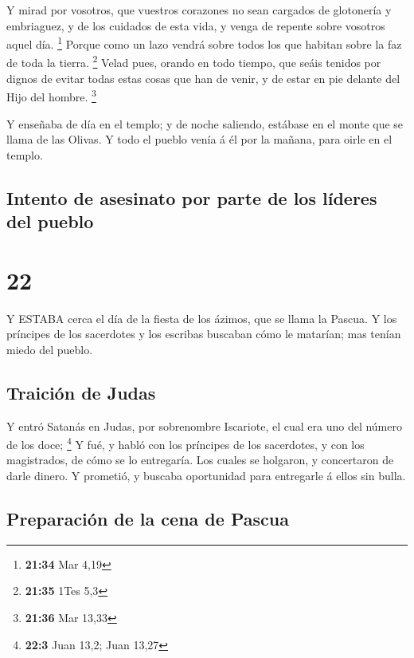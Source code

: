  Y mirad por vosotros, que vuestros corazones no sean
cargados de glotonería y embriaguez, y de los cuidados de esta vida, y
venga de repente sobre vosotros aquel día. \footnote{\textbf{21:34} Mar
  4,19}  Porque como un lazo vendrá sobre todos los que
habitan sobre la faz de toda la tierra. \footnote{\textbf{21:35} 1Tes
  5,3}  Velad pues, orando en todo tiempo, que seáis
tenidos por dignos de evitar todas estas cosas que han de venir, y de
estar en pie delante del Hijo del hombre. \footnote{\textbf{21:36} Mar
  13,33}

 Y enseñaba de día en el templo; y de noche saliendo,
estábase en el monte que se llama de las Olivas.  Y todo el
pueblo venía á él por la mañana, para oirle en el templo.

\hypertarget{intento-de-asesinato-por-parte-de-los-luxedderes-del-pueblo}{%
\subsection{Intento de asesinato por parte de los líderes del
pueblo}\label{intento-de-asesinato-por-parte-de-los-luxedderes-del-pueblo}}

\hypertarget{section-21}{%
\section{22}\label{section-21}}

 Y ESTABA cerca el día de la fiesta de los ázimos, que se
llama la Pascua.  Y los príncipes de los sacerdotes y los
escribas buscaban cómo le matarían; mas tenían miedo del pueblo.

\hypertarget{traiciuxf3n-de-judas}{%
\subsection{Traición de Judas}\label{traiciuxf3n-de-judas}}

 Y entró Satanás en Judas, por sobrenombre Iscariote, el
cual era uno del número de los doce; \footnote{\textbf{22:3} Juan 13,2;
  Juan 13,27}  Y fué, y habló con los príncipes de los
sacerdotes, y con los magistrados, de cómo se lo entregaría.
 Los cuales se holgaron, y concertaron de darle dinero.
 Y prometió, y buscaba oportunidad para entregarle á ellos
sin bulla.

\hypertarget{preparaciuxf3n-de-la-cena-de-pascua}{%
\subsection{Preparación de la cena de
Pascua}\label{preparaciuxf3n-de-la-cena-de-pascua}}

